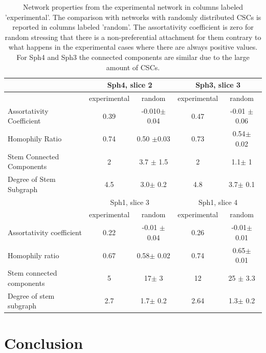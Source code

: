 \documentclass[fleqn,10pt]{wlscirep}
\begin{document}
\begin{table}[htbp]
\centering
\begin{tabular}{|l|c|c|c|c|}
\hline
 & \multicolumn{2}{|c|}{{\textsf Sph4, slice 2}}  &  \multicolumn{2}{|c|}{{\textsf Sph3, slice 3}}\\
\hline
 &experimental &random& experimental & random\\
\hline
Assortativity Coefficient &
0.39 & -0.010$\pm$ 0.04& 0.47 & -0.01 $\pm$ 0.06 \\
\hline
Homophily Ratio &  0.74&0.50 $\pm$0.03&0.73&  0.54$\pm$  0.02  \\
\hline
Stem Connected Components &2& 3.7 $\pm$ 1.5 &2&  1.1$\pm$  1 \\
\hline
Degree of Stem Subgraph &4.5& 3.0$\pm$ 0.2  &4.8& 3.7$\pm$ 0.1\\
\hline
\hline
\hline
 & \multicolumn{2}{|c|}{{\textsf Sph1, slice 3}} & \multicolumn{2}{|c|}{{\textsf Sph1, slice 4}}  \\
\hline
 & experimental & random& experimental&random \\
\hline
Assortativity coefficient &0.22 & -0.01 $\pm$ 0.04   &0.26& -0.01$\pm$ 0.01  \\
\hline
Homophily ratio  &0.67& 0.58$\pm$ 0.02 &0.74& 0.65$\pm$  0.01 \\
\hline
Stem connected components &5& 17$\pm$ 3 &12& 25 $\pm$ 3.3 \\
\hline
Degree of stem subgraph &2.7& 1.7$\pm$ 0.2 & 2.64 & 1.3$\pm$ 0.2  \\
\hline

\end{tabular}
\caption{Network properties from the experimental network in columns labeled 'experimental'. The comparison with networks with randomly distributed CSCs is reported in columns labeled 'random'. The assortativity coefficient is zero for random stressing that there is a non-preferential attachment for them contrary to what happens in the experimental cases where there are always positive values. For {\textsf Sph4} and {\textsf Sph3} the connected components are similar due to the large amount of CSCs.  }
\label{tab: ensemble statistics}
\end{table}



\section*{Conclusion} \label{s: conc}
\end{document}
